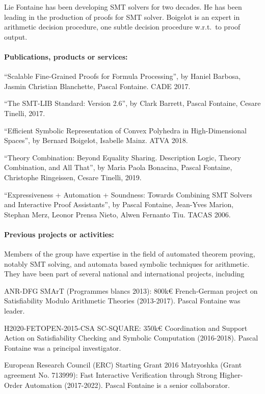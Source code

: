 \begin{sitedescription}{Lie}
Fontaine has been developing SMT solvers for two decades.  He has been leading in the production of proofs for SMT solver.  Boigelot is an expert in arithmetic decision procedure, one subtle decision procedure w.r.t.\ to proof output.

\paragraph*{Publications, products or services:}

\begin{compactitem}
\item ``Scalable Fine-Grained Proofs for Formula Processing'', by Haniel Barbosa, Jasmin Christian Blanchette, Pascal Fontaine. CADE 2017.

\item ``The SMT-LIB Standard: Version 2.6'', by Clark Barrett, Pascal Fontaine, Cesare Tinelli, 2017.

\item ``Efficient Symbolic Representation of Convex Polyhedra in High-Dimensional Spaces'', by Bernard Boigelot, Isabelle Mainz. ATVA 2018.

\item ``Theory Combination: Beyond Equality Sharing. Description Logic, Theory Combination, and All That'', by Maria Paola Bonacina, Pascal Fontaine, Christophe Ringeissen, Cesare Tinelli, 2019.

\item ``Expressiveness + Automation + Soundness: Towards Combining SMT Solvers and Interactive Proof Assistants'', by Pascal Fontaine, Jean-Yves Marion, Stephan Merz, Leonor Prensa Nieto, Alwen Fernanto Tiu. TACAS 2006.
\end{compactitem}

\paragraph*{Previous projects or activities:}

Members of the group have expertise in the field of automated theorem proving, notably SMT solving, and automata based symbolic techniques for arithmetic.  They have been part of several national and international projects, including
\begin{compactitem}
\item ANR-DFG SMArT (Programmes blancs 2013): 800k€ French-German project on Satisfiability Modulo Arithmetic Theories (2013-2017).  Pascal Fontaine was leader.
\item H2020-FETOPEN-2015-CSA SC-SQUARE: 350k€ Coordination and Support Action on Satisfiability Checking and Symbolic Computation (2016-2018).  Pascal Fontaine was a principal investigator.
\item European Research Council (ERC) Starting Grant 2016 Matryoshka (Grant
  agreement No. 713999): Fast Interactive Verification through Strong
  Higher-Order Automation (2017-2022).  Pascal Fontaine is a senior
  collaborator.
\end{compactitem}


\end{sitedescription}
